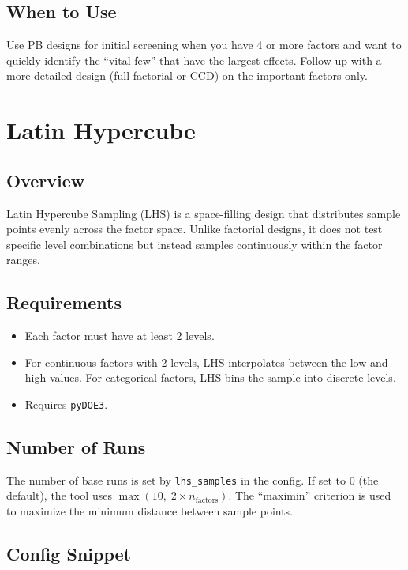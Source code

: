 \documentclass[11pt]{book}
\begin{document}
\subsection{When to Use}

Use PB designs for initial screening when you have 4 or more factors and want to quickly identify the ``vital few'' that have the largest effects. Follow up with a more detailed design (full factorial or CCD) on the important factors only.

\section{Latin Hypercube}

\subsection{Overview}

Latin Hypercube Sampling (LHS) is a space-filling design that distributes sample points evenly across the factor space. Unlike factorial designs, it does not test specific level combinations but instead samples continuously within the factor ranges.

\subsection{Requirements}
\begin{itemize}[nosep]
  \item Each factor must have at least 2 levels.
  \item For continuous factors with 2 levels, LHS interpolates between the low and high values. For categorical factors, LHS bins the sample into discrete levels.
  \item Requires \texttt{pyDOE3}.
\end{itemize}

\subsection{Number of Runs}

The number of base runs is set by \texttt{lhs\_samples} in the config. If set to 0 (the default), the tool uses $\max(10,\; 2 \times n_{\text{factors}})$. The ``maximin'' criterion is used to maximize the minimum distance between sample points.

\subsection{Config Snippet}
\end{document}
